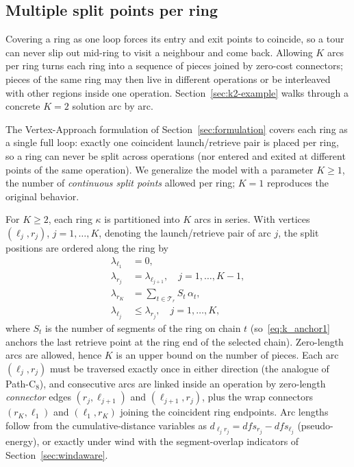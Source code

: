 \documentclass[12pt]{elsarticle}
\begin{document}
\subsection{Multiple split points per ring}\label{sec:splitpoints}

Covering a ring as one loop forces its entry and exit points to coincide, so a tour can never slip out mid-ring to visit a neighbour and come back. Allowing $K$ arcs per ring turns each ring into a sequence of pieces joined by zero-cost connectors; pieces of the same ring may then live in different operations or be interleaved with other regions inside one operation. Section~\ref{sec:k2-example} walks through a concrete $K=2$ solution arc by arc.

The Vertex-Approach formulation of Section~\ref{sec:formulation} covers each ring as a single full loop: exactly one coincident launch/retrieve pair is placed per ring, so a ring can never be split across operations (nor entered and exited at different points of the same operation).  We generalize the model with a parameter $K \ge 1$, the number of \emph{continuous split points} allowed per ring; $K=1$ reproduces the original behavior.

For $K \ge 2$, each ring $\kappa$ is partitioned into $K$ arcs in series.  With vertices $(\ell_j, r_j)$, $j=1,\dots,K$, denoting the launch/retrieve pair of arc $j$, the split positions are ordered along the ring by
\begin{align}
    \lambda_{\ell_1} &= 0, \tag{S-C$_1$}\label{eq:k_anchor0}\\
    \lambda_{r_j} &= \lambda_{\ell_{j+1}}, \quad j=1,\dots,K-1, \tag{S-C$_2$}\label{eq:k_chain}\\
    \lambda_{r_K} &= \sum_{t\in\mathcal T_r} S_{t}\, \alpha_t, \tag{S-C$_3$}\label{eq:k_anchor1}\\
    \lambda_{\ell_j} &\le \lambda_{r_j}, \quad j=1,\dots,K, \tag{S-C$_4$}\label{eq:k_order}
\end{align}
where $S_t$ is the number of segments of the ring on chain $t$ (so~\eqref{eq:k_anchor1} anchors the last retrieve point at the ring end of the selected chain).  Zero-length arcs are allowed, hence $K$ is an upper bound on the number of pieces.  Each arc $(\ell_j, r_j)$ must be traversed exactly once in either direction (the analogue of Path-C$_8$), and consecutive arcs are linked inside an operation by zero-length \emph{connector} edges $(r_j, \ell_{j+1})$ and $(\ell_{j+1}, r_j)$, plus the wrap connectors $(r_K, \ell_1)$ and $(\ell_1, r_K)$ joining the coincident ring endpoints.  Arc lengths follow from the cumulative-distance variables as $d_{\ell_j r_j} = dfs_{r_j} - dfs_{\ell_j}$ (pseudo-energy), or exactly under wind with the segment-overlap indicators of Section~\ref{sec:windaware}.
\end{document}
